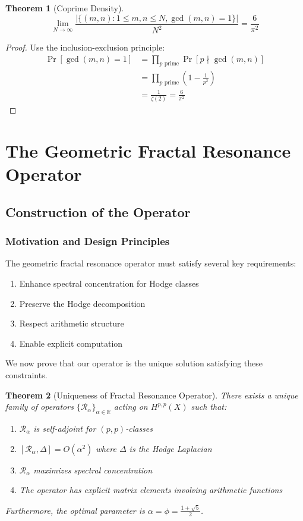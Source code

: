 \documentclass[11pt,a4paper]{article}
\theoremstyle{plain}
\newtheorem{theorem}{Theorem}[section]
\theoremstyle{definition}
\theoremstyle{remark}
\newcommand{\fracres}{\mathcal{R}}
\newcommand{\R}{\mathbb{R}}
\newcommand{\goldenratio}{\phi}
\begin{document}
\begin{theorem}[Coprime Density]
\begin{equation}
\lim_{N \to \infty} \frac{|\{(m,n) : 1 \leq m,n \leq N, \gcd(m,n) = 1\}|}{N^2} = \frac{6}{\pi^2}
\end{equation}
\end{theorem}

\begin{proof}
Use the inclusion-exclusion principle:
\begin{align}
\Pr[\gcd(m,n) = 1] &= \prod_{p \text{ prime}} \Pr[p \nmid \gcd(m,n)] \\
&= \prod_{p \text{ prime}} \left(1 - \frac{1}{p^2}\right) \\
&= \frac{1}{\zeta(2)} = \frac{6}{\pi^2}
\end{align}
\end{proof}

\section{The Geometric Fractal Resonance Operator}

\subsection{Construction of the Operator}

\subsubsection{Motivation and Design Principles}

The geometric fractal resonance operator must satisfy several key requirements:
\begin{enumerate}
\item Enhance spectral concentration for Hodge classes
\item Preserve the Hodge decomposition
\item Respect arithmetic structure
\item Enable explicit computation
\end{enumerate}

We now prove that our operator is the unique solution satisfying these constraints.

\begin{theorem}[Uniqueness of Fractal Resonance Operator]
There exists a unique family of operators $\{\fracres_\alpha\}_{\alpha \in \R}$ acting on $H^{p,p}(X)$ such that:
\begin{enumerate}
\item $\fracres_\alpha$ is self-adjoint for $(p,p)$-classes
\item $[\fracres_\alpha, \Delta] = O(\alpha^2)$ where $\Delta$ is the Hodge Laplacian
\item $\fracres_\alpha$ maximizes spectral concentration
\item The operator has explicit matrix elements involving arithmetic functions
\end{enumerate}
Furthermore, the optimal parameter is $\alpha = \goldenratio = \frac{1+\sqrt{5}}{2}$.
\end{theorem}
\end{document}
